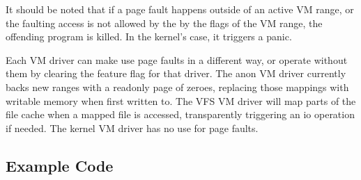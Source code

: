 It should be noted that if a page fault happens outside of an active VM range, or the faulting access is not allowed by the by the flags of the VM range, the offending program is killed. In the kernel's case, it triggers a panic.

Each VM driver can make use page faults in a different way, or operate without them by clearing the feature flag for that driver. The anon VM driver currently backs new ranges with a readonly page of zeroes, replacing those mappings with writable memory when first written to. The VFS VM driver will map parts of the file cache when a mapped file is accessed, transparently triggering an io operation if needed. The kernel VM driver has no use for page faults.

\subsection{Example Code}
